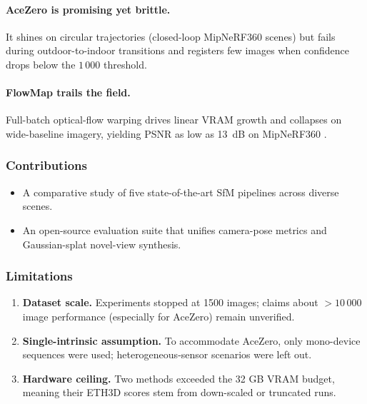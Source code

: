 \paragraph{AceZero is promising yet brittle.}
It shines on circular trajectories (closed-loop MipNeRF360 scenes) but fails during outdoor-to-indoor transitions and registers few images when confidence drops below the $1\,000$ threshold.

\paragraph{FlowMap trails the field.}
Full-batch optical-flow warping drives linear VRAM growth and collapses on wide-baseline imagery, yielding PSNR as low as \SI{13}{dB} on MipNeRF360 .


\subsubsection{Contributions}
\begin{itemize}
    \item A comparative study of five state-of-the-art SfM pipelines across diverse scenes.
    \item An open-source evaluation suite that unifies camera-pose metrics and Gaussian-splat novel-view synthesis.
\end{itemize}

\subsubsection{Limitations}
\begin{enumerate}
    \item \textbf{Dataset scale.} Experiments stopped at 1500 images; claims about $>10\,000$ image performance (especially for AceZero) remain unverified.
    \item \textbf{Single-intrinsic assumption.} To accommodate AceZero, only mono-device sequences were used; heterogeneous-sensor scenarios were left out.
    \item \textbf{Hardware ceiling.} Two methods exceeded the 32 GB VRAM budget, meaning their ETH3D scores stem from down-scaled or truncated runs.
\end{enumerate}

